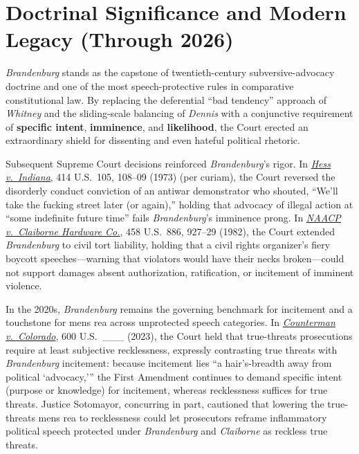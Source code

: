 \documentclass[12pt]{article}
\begin{document}
\section{Doctrinal Significance and Modern Legacy (Through 2026)}

\emph{Brandenburg} stands as the capstone of twentieth-century subversive-advocacy doctrine and one of the most speech-protective rules in comparative constitutional law. By replacing the deferential ``bad tendency'' approach of \emph{Whitney} and the sliding-scale balancing of \emph{Dennis} with a conjunctive requirement of \textbf{specific intent}, \textbf{imminence}, and \textbf{likelihood}, the Court erected an extraordinary shield for dissenting and even hateful political rhetoric.

Subsequent Supreme Court decisions reinforced \emph{Brandenburg}'s rigor. In \href{https://supreme.justia.com/cases/federal/us/414/105/}{\emph{Hess v.\ Indiana}}, 414 U.S.\ 105, 108--09 (1973) (per curiam), the Court reversed the disorderly conduct conviction of an antiwar demonstrator who shouted, ``We'll take the fucking street later (or again),'' holding that advocacy of illegal action at ``some indefinite future time'' fails \emph{Brandenburg}'s imminence prong. In \href{https://supreme.justia.com/cases/federal/us/458/886/}{\emph{NAACP v.\ Claiborne Hardware Co.}}, 458 U.S.\ 886, 927--29 (1982), the Court extended \emph{Brandenburg} to civil tort liability, holding that a civil rights organizer's fiery boycott speeches---warning that violators would have their necks broken---could not support damages absent authorization, ratification, or incitement of imminent violence.

In the 2020s, \emph{Brandenburg} remains the governing benchmark for incitement and a touchstone for mens rea across unprotected speech categories. In \href{https://www.law.cornell.edu/supremecourt/text/22-138}{\emph{Counterman v.\ Colorado}}, 600 U.S.\ \_\_\_ (2023), the Court held that true-threats prosecutions require at least subjective recklessness, expressly contrasting true threats with \emph{Brandenburg} incitement: because incitement lies ``a hair's-breadth away from political `advocacy,''' the First Amendment continues to demand specific intent (purpose or knowledge) for incitement, whereas recklessness suffices for true threats. Justice Sotomayor, concurring in part, cautioned that lowering the true-threats mens rea to recklessness could let prosecutors reframe inflammatory political speech protected under \emph{Brandenburg} and \emph{Claiborne} as reckless true threats.
\end{document}

